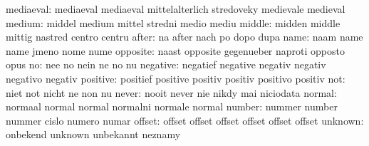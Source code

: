                 mediaeval: mediaeval                 mediaeval
                           mittelalterlich           stredoveky
                           medievale                 medieval
                   medium: middel                    medium
                           mittel                    stredni
                           medio                     mediu
                   middle: midden                    middle
                           mittig                    nastred
                           centro                    centru
                    after: na                        after
                           nach                      po
                           dopo                      dupa
                     name: naam                      name
                           name                      jmeno
                           nome                      nume
                 opposite: naast                     opposite
                           gegenueber                naproti
                           opposto                   opus
                       no: nee                       no
                           nein                      ne
                           no                        nu
                 negative: negatief                  negative
                           negativ                   negativ
                           negativo                  negativ
                 positive: positief                  positive
                           positiv                   positiv
                           positivo                  positiv
                      not: niet                      not
                           nicht                     ne
                           non                       nu
                    never: nooit                     never
                           nie                       nikdy
                           mai                       niciodata
                   normal: normaal                   normal
                           normal                    normalni
                           normale                   normal
                   number: nummer                    number
                           nummer                    cislo
                           numero                    numar
                   offset: offset                    offset
                           offset                    offset
                           offset                    offset
                  unknown: onbekend                  unknown
                           unbekannt                 neznamy
